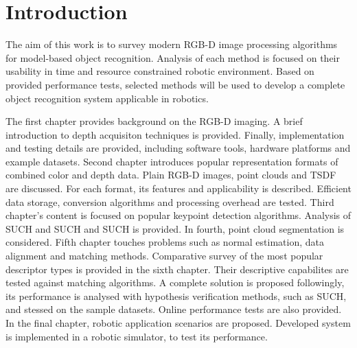 \chapter*{Introduction}
\label{cha:introduction}



The aim of this work is to survey modern RGB-D image processing algorithms for model-based object recognition. Analysis of each method is focused on their usability in time and resource constrained robotic environment. Based on provided performance tests, selected methods will be used to develop a complete object recognition system applicable in robotics.

The first chapter provides background on the RGB-D imaging. A brief introduction to depth acquisiton techniques is provided.
Finally, implementation and testing details are provided, including software tools, hardware platforms and example datasets. %
Second chapter introduces popular representation formats of combined color and depth data. Plain RGB-D images, point clouds and TSDF are discussed. For each format, its features and applicability is described. Efficient data storage, conversion algorithms and processing overhead are tested. %
Third chapter's content is focused on popular keypoint detection algorithms. Analysis of SUCH and SUCH and SUCH is provided.
In fourth, point cloud segmentation is considered.
Fifth chapter touches problems such as normal estimation, data alignment and matching methods. Comparative survey of the most popular descriptor types is provided in the sixth chapter. Their descriptive capabilites are tested against matching algorithms. A complete solution is proposed followingly, its performance is analysed with hypothesis verification methods, such as SUCH, and stessed on the sample datasets. Online performance tests are also provided.
In the final chapter, robotic application scenarios are proposed. %
Developed system is implemented in a robotic simulator, to test its performance.


